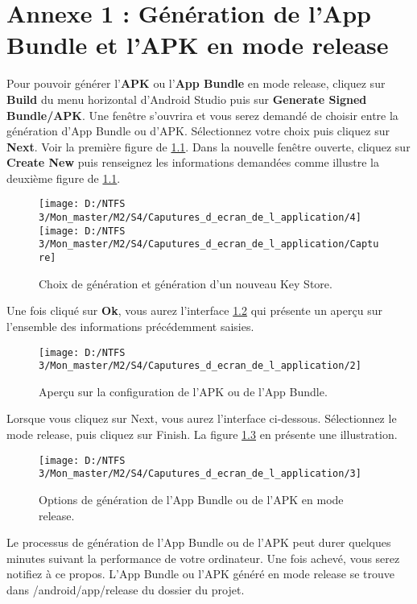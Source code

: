 \chapter{Annexe 1 : Génération de l'App Bundle et l’APK en mode release}
\label{chap:annexe1}

Pour pouvoir générer l’\textbf{\gls{APK}} ou l'\textbf{App Bundle} en mode release, cliquez sur \textbf{Build} du menu horizontal d’Android Studio puis sur \textbf{Generate Signed Bundle/APK}. Une fenêtre s’ouvrira et vous serez demandé de choisir entre la génération d'App Bundle ou d’APK. Sélectionnez votre choix puis cliquez sur \textbf{Next}. Voir la première figure de \ref{Figure 7.1}. Dans la nouvelle fenêtre ouverte, cliquez sur \textbf{Create New} puis renseignez les informations demandées comme illustre la deuxième figure de \ref{Figure 7.1}.
\begin{figure}[!ht]
	\texttt{[image: D:/NTFS 3/Mon\_master/M2/S4/Caputures\_d\_ecran\_de\_l\_application/4]}
	\texttt{[image: D:/NTFS 3/Mon\_master/M2/S4/Caputures\_d\_ecran\_de\_l\_application/Capture]}
	\centering
	\caption{Choix de génération et génération d’un nouveau Key Store.}
	\label{Figure 7.1}
\end{figure}
\newline Une fois cliqué sur \textbf{Ok}, vous aurez l’interface \ref{Figure 7.2} qui présente un aperçu sur l’ensemble des informations précédemment saisies.
\begin{figure}[!ht]
	\texttt{[image: D:/NTFS 3/Mon\_master/M2/S4/Caputures\_d\_ecran\_de\_l\_application/2]}
	\centering
	\caption{Aperçu sur la configuration de l’APK ou de l'App Bundle.}
	\label{Figure 7.2}
\end{figure}
\newline Lorsque vous cliquez sur Next, vous aurez l’interface ci-dessous. Sélectionnez le mode release, puis cliquez sur Finish. La figure \ref{Figure 7.3} en présente une illustration.
\begin{figure}[!ht]
	\texttt{[image: D:/NTFS 3/Mon\_master/M2/S4/Caputures\_d\_ecran\_de\_l\_application/3]}
	\centering
	\caption{Options de génération de l'App Bundle ou de l’APK en mode release.}
	\label{Figure 7.3}
\end{figure}
\newline Le processus de génération de l'App Bundle ou de l’APK peut durer quelques minutes suivant la performance de votre ordinateur. Une fois achevé, vous serez notifiez à ce propos. L'App Bundle ou l’APK généré en mode release se trouve dans /android/app/release du dossier du projet.